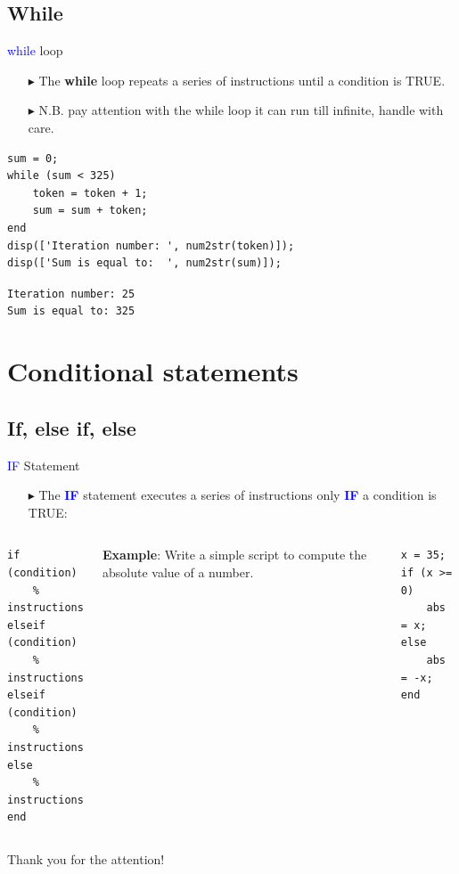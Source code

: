 \documentclass[aspectratio=169]{beamer}
\begin{document}
\subsection{While}
\begin{frame}[fragile]{\textcolor{blue}{while} loop}
    \begin{itemize}
        \item[$\blacktriangleright$]
        The \textbf{while} loop repeats a series of instructions \alert{until a condition is TRUE}.

        \item[$\blacktriangleright$]
        N.B. pay attention with the while loop it can run till infinite, \alert{handle with care}.
    \end{itemize}
    \begin{verbatim}
sum = 0;
while (sum < 325)
    token = token + 1;
    sum = sum + token;
end
disp(['Iteration number: ', num2str(token)]);
disp(['Sum is equal to:  ', num2str(sum)]);
    \end{verbatim}
    \texttt{Iteration number: 25} \\
    \texttt{Sum is equal to: 325}
\end{frame}

\section{Conditional statements}
\subsection{If, else if, else}
\begin{frame}[fragile]{\textcolor{blue}{IF} Statement}
    \begin{itemize}
        \item[$\blacktriangleright$]
        The \textcolor{blue}{\textbf{IF}} statement executes a series of instructions only \textcolor{blue}{\textbf{IF}} a condition is TRUE:
    \end{itemize}

    \vspace{1.cm}
    \begin{columns}
        \begin{verbatim}
if (condition)
    % instructions
elseif (condition)
    % instructions
elseif (condition)
    % instructions
else
    % instructions
end
        \end{verbatim}
        \textcolor{NavyBlue}{\textbf{Example}: Write a simple script to compute the absolute value of a number.}
        \vspace{0.01cm}
        \begin{verbatim}
x = 35;
if (x >= 0)
    abs = x;
else
    abs = -x;
end
        \end{verbatim}
    \end{columns}
\end{frame}

{
    \begin{frame}[standout]
        Thank you for the attention!
    \end{frame}
}
\end{document}
